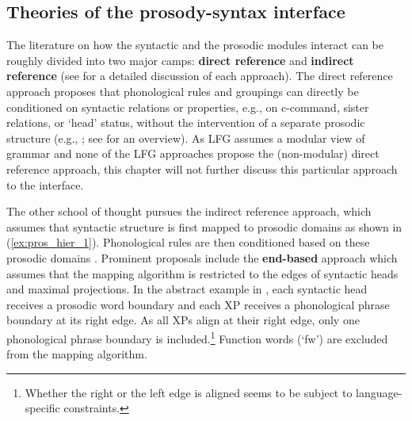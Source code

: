 \documentclass[output=paper,hidelinks]{langscibook}
\begin{document}

\subsection{Theories of the prosody-syntax interface}
\label{subsec:ps_interface}
The literature on how the syntactic and the prosodic modules interact can be roughly divided into two major camps: {\bf direct reference} and {\bf indirect reference} (see \citealt{BennettElfner2019} for a detailed discussion of each approach). The direct reference approach proposes that phonological rules and groupings can directly be conditioned on syntactic relations or properties, e.g., on c-command, sister relations, or `head' status, without the intervention of a separate prosodic structure (e.g., \citealt{Kaisse1985}; see \citealt{Elordieta2008} for an overview). As LFG  assumes a modular view of grammar and none of the LFG approaches propose the (non-modular) direct reference approach, this chapter will not further discuss this particular approach to the interface. 

The other school of thought pursues the indirect reference approach, which assumes that syntactic structure is first mapped to prosodic domains as shown in (\ref{ex:pros_hier_1}). Phonological rules are then conditioned based on these prosodic domains \citep[e.g.,][]{HayesLahiri1991}. Prominent proposals include the {\bf end-based} approach \citep{Selkirk1986,Chen1987} which assumes that the mapping algorithm is restricted to the edges of syntactic heads and maximal projections. 
In the abstract example in , each syntactic head receives a prosodic word boundary and each XP receives a phonological phrase boundary at its right edge. As all XPs align at their right edge, only one phonological phrase boundary is included.\footnote{Whether the right or the left edge is aligned seems to be subject to language-specific constraints.} Function words (`fw') are excluded from the mapping algorithm.
\end{document}
